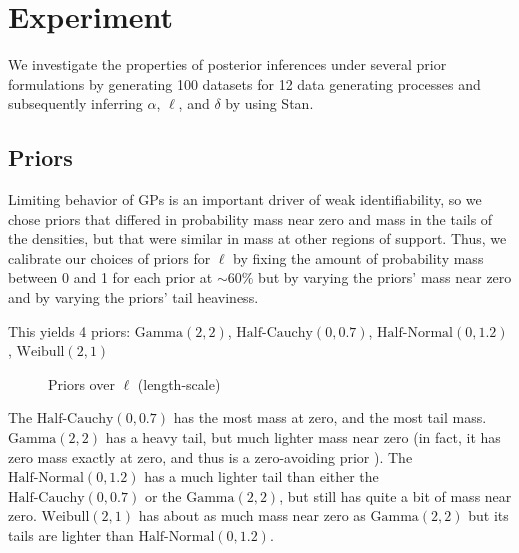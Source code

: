 \documentclass{article}
\begin{document}
\section{Experiment} \label{experiment}

We investigate the properties of posterior inferences under several prior
formulations by generating 100 datasets for 12 data generating processes and
subsequently inferring $\alpha$, $\ell$, and $\delta$ by using Stan.

\subsection{Priors}


Limiting behavior of GPs is an important driver of weak identifiability, so we
chose priors that differed in probability mass near zero and mass
in the tails of the densities, but that were similar in mass at other regions
of support. Thus, we calibrate our choices of priors for $\ell$ by fixing the
amount of probability mass between 0 and 1 for each prior at $\sim60\%$ but by
varying the priors' mass near zero and by varying the priors' tail heaviness.

This yields 4 priors: $\text{Gamma}(2, 2)$, $\text{Half-Cauchy}(0, 0.7)$,
$\text{Half-Normal}(0, 1.2)$, $\text{Weibull}(2, 1)$
\begin{figure}[t] 
  \caption{Priors over $\ell$ (length-scale)} \label{prior_plot}
\end{figure}
The $\text{Half-Cauchy}(0, 0.7)$ has the most mass at zero, and the most tail
mass. $\text{Gamma}(2, 2)$ has a heavy tail, but much lighter mass near zero
(in fact, it has zero mass exactly at zero, and thus is a zero-avoiding prior
\citet{gelman2014bayesian}). The $\text{Half-Normal}(0, 1.2)$ has a much
lighter tail than either the $\text{Half-Cauchy}(0, 0.7)$ or the
$\text{Gamma}(2, 2)$, but still has quite a bit of mass near zero.
$\text{Weibull}(2, 1)$ has about as much mass near zero as $\text{Gamma}(2, 2)$
but its tails are lighter than $\text{Half-Normal}(0, 1.2)$.
\end{document}
